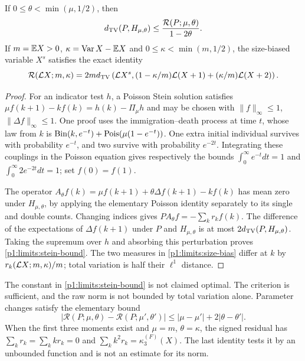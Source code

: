 \begin{lemma}
\label{p1:limits:stein}
If $0\le\theta<\min(\mu,1/2)$, then
\begin{equation}
 d_{\mathrm{TV}}(P,H_{\mu,\theta})
       \le\frac{\mathcal R(P;\mu,\theta)}{1-2\theta}.
 \label{p1:limits:stein-bound}
\end{equation}
If $m=\mathbb E X>0$, $\kappa=\operatorname{Var} X-\mathbb E X$ and
$0\le\kappa<\min(m,1/2)$, the size-biased variable $X^s$
satisfies the exact identity
\begin{equation}
 \mathcal R(\mathcal L X;m,\kappa)
 =2md_{\mathrm{TV}}\left(\mathcal L X^s,
       (1-\kappa/m)\mathcal L(X+1)+(\kappa/m)\mathcal L(X+2)\right).
 \label{p1:limits:size-bias}
\end{equation}
\end{lemma}
\begin{proof}
For an indicator test $h$, a Poisson Stein solution satisfies
$\mu f(k+1)-kf(k)=h(k)-\Pi_\mu h$ and may be chosen with
$\|f\|_\infty\le1$, $\|\Delta f\|_\infty\le1$.
One proof uses the immigration--death process at time $t$,
whose law from $k$ is
$\mathrm{Bin}(k,e^{-t})+\operatorname{Pois}(\mu(1-e^{-t}))$.
One extra initial individual survives with probability $e^{-t}$,
and two survive with probability $e^{-2t}$.  Integrating these
couplings in the Poisson equation gives respectively the bounds
$\int_0^\infty e^{-t}dt=1$ and
$\int_0^\infty2e^{-2t}dt=1$; set $f(0)=f(1)$.

The operator
$A_\theta f(k)=\mu f(k+1)+\theta\Delta f(k+1)-kf(k)$
has mean zero under $H_{\mu,\theta}$, by applying the elementary
Poisson identity separately to its single and double counts.
Changing indices gives
$P A_\theta f=-\sum_kr_kf(k)$.
The difference of the expectations of $\Delta f(k+1)$ under
$P$ and $H_{\mu,\theta}$ is at most
$2d_{\mathrm{TV}}(P,H_{\mu,\theta})$.  Taking the supremum over $h$
and absorbing this perturbation proves
\eqref{p1:limits:stein-bound}.  The two measures in
\eqref{p1:limits:size-bias} differ at $k$ by
$r_k(\mathcal L X;m,\kappa)/m$; total variation is half their
$\ell^1$ distance.
\end{proof}

The constant in \eqref{p1:limits:stein-bound} is not claimed
optimal.  The criterion is sufficient, and the raw norm is not
bounded by total variation alone.  Parameter changes satisfy
the elementary bound
\begin{equation}
 |\mathcal R(P;\mu,\theta)-\mathcal R(P;\mu',\theta')|
       \le|\mu-\mu'|+2|\theta-\theta'|.
 \label{p1:limits:residual-parameters}
\end{equation}
When the first three moments exist and $\mu=m$, $\theta=\kappa$,
the signed residual has
$\sum_kr_k=\sum_kkr_k=0$ and
$\sum_kk^2r_k=\kappa_3^{(F)}(X)$.
The last identity tests it by an unbounded function and is not
an estimate for its norm.

